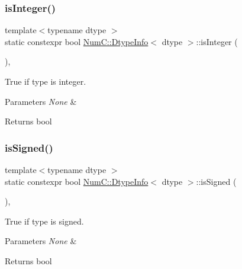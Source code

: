 \subsubsection{\texorpdfstring{is\+Integer()}{isInteger()}}
{\footnotesize\ttfamily template$<$typename dtype $>$ \\
static constexpr bool \mbox{\hyperlink{class_num_c_1_1_dtype_info}{Num\+C\+::\+Dtype\+Info}}$<$ dtype $>$\+::is\+Integer (\begin{DoxyParamCaption}{ }\end{DoxyParamCaption})\hspace{0.3cm}{\ttfamily [inline]}, {\ttfamily [static]}}

True if type is integer.


\begin{DoxyParams}{Parameters}
{\em None} & \\
\hline
\end{DoxyParams}
\begin{DoxyReturn}{Returns}
bool 
\end{DoxyReturn}
\mbox{\label{class_num_c_1_1_dtype_info_ab9b12306c685ba2c50c896ed340668e2}} 
\subsubsection{\texorpdfstring{is\+Signed()}{isSigned()}}
{\footnotesize\ttfamily template$<$typename dtype $>$ \\
static constexpr bool \mbox{\hyperlink{class_num_c_1_1_dtype_info}{Num\+C\+::\+Dtype\+Info}}$<$ dtype $>$\+::is\+Signed (\begin{DoxyParamCaption}{ }\end{DoxyParamCaption})\hspace{0.3cm}{\ttfamily [inline]}, {\ttfamily [static]}}

True if type is signed.


\begin{DoxyParams}{Parameters}
{\em None} & \\
\hline
\end{DoxyParams}
\begin{DoxyReturn}{Returns}
bool 
\end{DoxyReturn}
\mbox{\label{class_num_c_1_1_dtype_info_ac19287412d0d71988d09bba9a4e3a01c}} 
